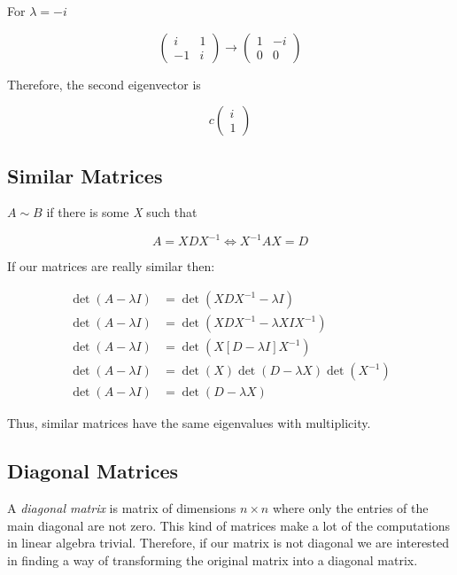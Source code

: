 For \(\lambda = -i\)

\[     
    \begin{pmatrix}
        i & 1 \\
        -1 & i
    \end{pmatrix}
    \rightarrow
    \begin{pmatrix}
        1 & -i \\
        0 & 0
    \end{pmatrix} 
\]

Therefore, the second eigenvector is 

\[  
    c
    \begin{pmatrix}
        i \\
        1        
    \end{pmatrix}
\]

\subsection{Similar Matrices}

\(A \sim B\) if there is some \emph{X} such that 

\[
    A = XDX^{-1} \iff X^{-1}AX = D
\]

If our matrices are really similar then:

\begin{align*}
    \det(A - \lambda I) &= \det(XDX^{-1} - \lambda I)\\
    \det(A - \lambda I) &= \det(XDX^{-1} - \lambda X I X^{-1})\\
    \det(A - \lambda I) &= \det(X[D - \lambda I] X^{-1})\\
    \det(A - \lambda I) &= \det(X)\det(D - \lambda X) \det(X^{-1})\\
    \det(A - \lambda I) &= \det(D - \lambda X) 
\end{align*}

Thus, similar matrices have the same eigenvalues with multiplicity.

\subsection{Diagonal Matrices}

A \emph{diagonal matrix} is matrix of dimensions \(n \times n\) where only the entries of the main diagonal 
are not zero. This kind of matrices make a lot of the computations in linear algebra trivial. Therefore, 
if our matrix is not diagonal we are interested in finding a way of transforming the original matrix 
into a diagonal matrix.
\vspace{\baselineskip} 

